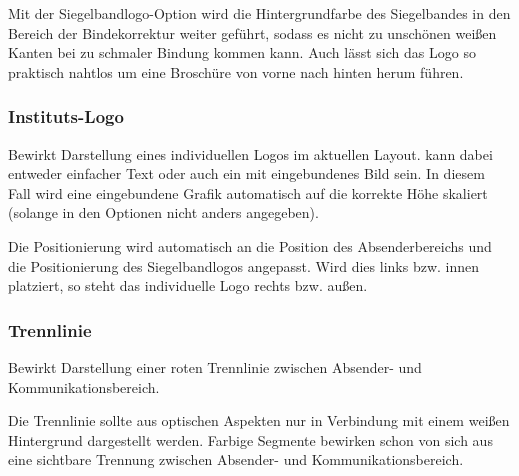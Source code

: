 \begin{Declaration}
\end{Declaration}

Mit der Siegelbandlogo-Option  wird die Hintergrundfarbe
des Siegelbandes in den Bereich der Bindekorrektur weiter geführt,
sodass es nicht zu unschönen weißen Kanten bei zu schmaler Bindung kommen kann.
Auch lässt sich das Logo so praktisch nahtlos um eine Broschüre von vorne
nach hinten herum führen.

\subsubsection{Instituts-Logo}

\vspace*{-5mm}
\begin{Declaration}
\end{Declaration}

Bewirkt Darstellung eines individuellen Logos im aktuellen Layout.
 kann dabei entweder einfacher Text oder auch ein
mit  eingebundenes Bild sein.
In diesem Fall wird eine eingebundene Grafik automatisch auf die korrekte
Höhe skaliert (solange in den Optionen nicht anders angegeben).

Die Positionierung wird automatisch an die Position des Absenderbereichs und
die Positionierung des Siegelbandlogos angepasst.
Wird dies links bzw. innen platziert, so steht das individuelle
Logo rechts bzw. außen.

\subsubsection{Trennlinie}

\vspace*{-5mm}
\begin{Declaration}
\end{Declaration}

Bewirkt Darstellung einer roten Trennlinie zwischen Absender- und Kommunikationsbereich.

\begin{hint}
  Die Trennlinie sollte aus optischen Aspekten nur in Verbindung
  mit einem weißen Hintergrund dargestellt werden.
  Farbige Segmente bewirken schon von sich aus eine sichtbare Trennung zwischen 
  Absender- und Kommunikationsbereich.
\end{hint}


